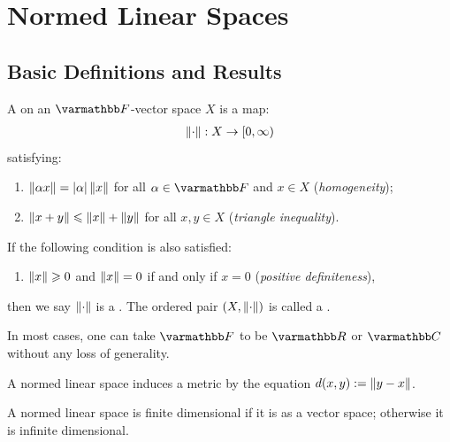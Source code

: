 \chapter{Normed Linear Spaces}
\vspace{-25pt}
\section{Basic Definitions and Results}

\begin{definition}
A  on an $\bfF$-vector space $X$ is a map:
    \begin{equation*}
    \begin{split}
        \left\lVert \cdot \right\rVert :X \rightarrow [0,\infty)
    \end{split}
    \end{equation*}
satisfying:
    \begin{enumerate}[label = (\arabic*),itemsep=1pt,topsep=3pt]
        \item $\left\lVert \alpha x \right\rVert = |\alpha| \left\lVert x \right\rVert$ for all $\alpha \in \bfF$ and $x \in X$ (\textit{homogeneity});
        \item $\left\lVert x + y \right\rVert \leqslant \left\lVert x \right\rVert + \left\lVert y \right\rVert$ for all $x,y \in X$ (\textit{triangle inequality}).
    \end{enumerate}
If the following condition is also satisfied:
    \begin{enumerate}[label = (\arabic*),itemsep=1pt,topsep=3pt]
        \addtocounter{enumi}{2}
        \item $\left\lVert x \right\rVert \geqslant 0$ and $\left\lVert x \right\rVert = 0$ if and only if $x = 0$ (\textit{positive definiteness}),
    \end{enumerate}
then we say $\left\lVert \cdot \right\rVert$ is a . The ordered pair $(X,\left\lVert \cdot \right\rVert)$ is called a .
\end{definition}

\begin{remark}
    In most cases, one can take $\bfF$ to be $\bfR$ or $\bfC$ without any loss of generality.
\end{remark}

\begin{remark}
    A normed linear space induces a metric by the equation $d(x,y) := \left\lVert y-x \right\rVert$.
\end{remark}

\begin{remark}
    A normed linear space is finite dimensional if it is as a vector space; otherwise it is infinite dimensional.
\end{remark}

